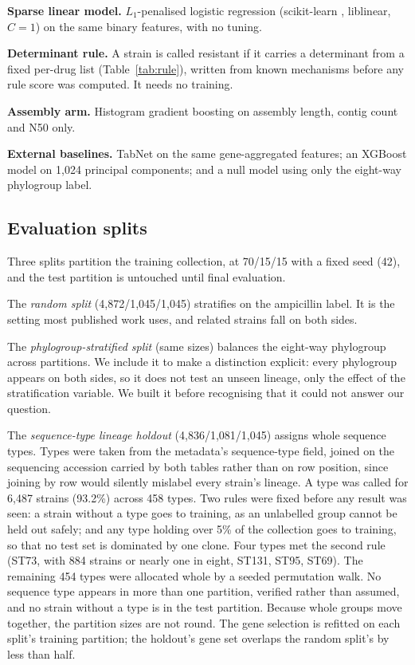 \textbf{Sparse linear model.} $L_1$-penalised logistic regression (scikit-learn
\cite{pedregosa2011sklearn}, liblinear, $C = 1$) on the same binary features, with no tuning.

\textbf{Determinant rule.} A strain is called resistant if it carries a determinant from a fixed
per-drug list (Table~\ref{tab:rule}), written from known mechanisms before any rule score was
computed. It needs no training.

\textbf{Assembly arm.} Histogram gradient boosting on assembly length, contig count and N50 only.

\textbf{External baselines.} TabNet \cite{arik2021tabnet} on the same gene-aggregated features; an
XGBoost model on 1,024 principal components; and a null model using only the eight-way phylogroup
label.

\subsection*{Evaluation splits}
Three splits partition the training collection, at 70/15/15 with a fixed seed (42), and the test
partition is untouched until final evaluation.

The \emph{random split} (4,872/1,045/1,045) stratifies on the ampicillin label. It is the setting
most published work uses, and related strains fall on both sides.

The \emph{phylogroup-stratified split} (same sizes) balances the eight-way phylogroup across
partitions. We include it to make a distinction explicit: every phylogroup appears on both sides,
so it does not test an unseen lineage, only the effect of the stratification variable. We built it
before recognising that it could not answer our question.

The \emph{sequence-type lineage holdout} (4,836/1,081/1,045) assigns whole sequence types. Types
were taken from the metadata's sequence-type field, joined on the sequencing accession carried by
both tables rather than on row position, since joining by row would silently mislabel every
strain's lineage. A type was called for 6,487 strains (93.2\%) across 458 types. Two rules were
fixed before any result was seen: a strain without a type goes to training, as an unlabelled group
cannot be held out safely; and any type holding over 5\% of the collection goes to training, so
that no test set is dominated by one clone. Four types met the second rule (ST73, with 884 strains
or nearly one in eight, ST131, ST95, ST69). The remaining 454 types were allocated whole by a
seeded permutation walk. No sequence type appears in more than one partition, verified rather than
assumed, and no strain without a type is in the test partition. Because whole groups move together,
the partition sizes are not round. The gene selection is refitted on each split's training
partition; the holdout's gene set overlaps the random split's by less than half.

